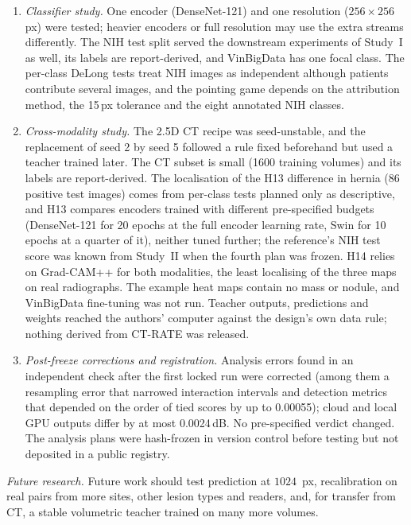 \begin{enumerate}
 is no lateral imaging and no reader study. On JSRT the bone overlap of each audit site came from the reference model's bone map.
 Downstream models were not tuned per input, and the overlap analysis is not estimable on TBX11K. The models are for research use only.
\item \emph{Classifier study.} One encoder (DenseNet-121) and one resolution ($256\times256$\,px) were tested; heavier encoders or full
 resolution may use the extra streams differently. The NIH test split served the downstream experiments of Study~I as well, its labels are
 report-derived, and VinBigData has one focal class. The per-class DeLong tests treat NIH images as independent although patients
 contribute several images, and the pointing game depends on the attribution method, the 15\,px tolerance and the eight annotated NIH
 classes.
\item \emph{Cross-modality study.} The 2.5D CT recipe was seed-unstable, and the replacement of seed 2 by seed 5 followed a rule fixed
 beforehand but used a teacher trained later. The CT subset is small (\num{1600} training volumes) and its labels are report-derived. The
 localisation of the H13 difference in hernia (86 positive test images) comes from per-class tests planned only as descriptive, and H13
 compares encoders trained with different pre-specified budgets (DenseNet-121 for 20 epochs at the full encoder learning rate, Swin for 10
 epochs at a quarter of it), neither tuned further; the reference's NIH test score was known from Study~II when the fourth plan was
 frozen. H14 relies on Grad-CAM++ for both modalities, the least localising of the three maps on real radiographs. The example heat maps
 contain no mass or nodule, and VinBigData fine-tuning was not run. Teacher outputs, predictions and weights reached the authors' computer
 against the design's own data rule; nothing derived from CT-RATE was released.
\item \emph{Post-freeze corrections and registration.} Analysis errors found in an independent check after the first locked run were
 corrected (among them a resampling error that narrowed interaction intervals and detection metrics that depended on the order of tied
 scores by up to 0.00055); cloud and local GPU outputs differ by at most 0.0024\,dB. No pre-specified verdict changed. The analysis plans
 were hash-frozen in version control before testing but not deposited in a public registry.
\end{enumerate}

\emph{Future research.} Future work should test prediction at $1024$~px, recalibration on real pairs from more sites, other lesion types and
readers, and, for transfer from CT, a stable volumetric teacher trained on many more volumes.
